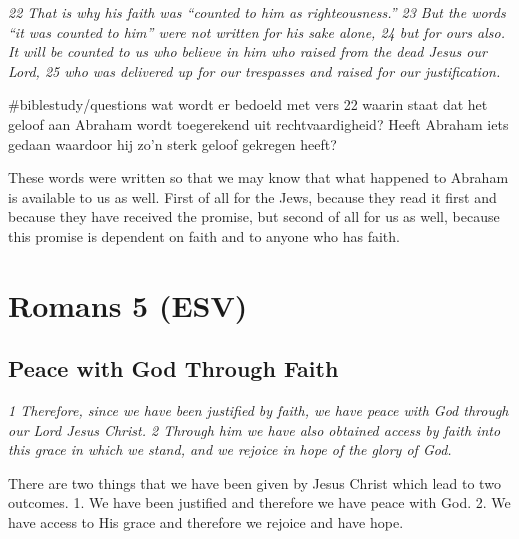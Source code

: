 \emph{22 That is why his faith was ``counted to him as righteousness.''
23 But the words ``it was counted to him'' were not written for his sake
alone, 24 but for ours also. It will be counted to us who believe in him
who raised from the dead Jesus our Lord, 25 who was delivered up for our
trespasses and raised for our justification.}

\#biblestudy/questions wat wordt er bedoeld met vers 22 waarin staat dat
het geloof aan Abraham wordt toegerekend uit rechtvaardigheid? Heeft
Abraham iets gedaan waardoor hij zo'n sterk geloof gekregen heeft?

These words were written so that we may know that what happened to
Abraham is available to us as well. First of all for the Jews, because
they read it first and because they have received the promise, but
second of all for us as well, because this promise is dependent on faith
and to anyone who has faith.



\hypertarget{romans-5-esv}{%
\section{Romans 5 (ESV)}\label{romans-5-esv}}
\vspace{10.5cm}
\subsection{Peace with God Through Faith} \emph{1 Therefore, since we have
been justified by faith, we have peace with God through our Lord Jesus
Christ. 2 Through him we have also obtained access by faith into this
grace in which we stand, and we rejoice in hope of the glory of God.}

There are two things that we have been given by Jesus Christ which lead
to two outcomes. 1. We have been justified and therefore we have peace
with God. 2. We have access to His grace and therefore we rejoice and
have hope.

